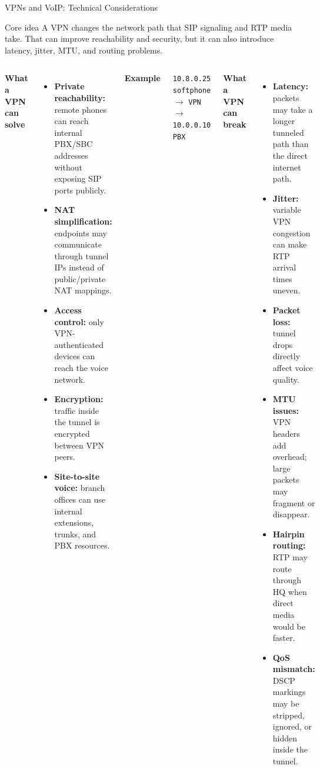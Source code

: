 \documentclass[aspectratio=169]{beamer}
\begin{document}
\begin{frame}{VPNs and VoIP: Technical Considerations}
\scriptsize

\begin{block}{Core idea}
A VPN changes the network path that SIP signaling and RTP media take. That can improve reachability and security, but it can also introduce latency, jitter, MTU, and routing problems.
\end{block}

\vspace{0.15cm}

\begin{columns}[T]

\textbf{What a VPN can solve}

\begin{itemize}
    \item \textbf{Private reachability:} remote phones can reach internal PBX/SBC addresses without exposing SIP ports publicly.
    \item \textbf{NAT simplification:} endpoints may communicate through tunnel IPs instead of public/private NAT mappings.
    \item \textbf{Access control:} only VPN-authenticated devices can reach the voice network.
    \item \textbf{Encryption:} traffic inside the tunnel is encrypted between VPN peers.
    \item \textbf{Site-to-site voice:} branch offices can use internal extensions, trunks, and PBX resources.
\end{itemize}

\textbf{Example}

\begin{center}
\texttt{10.8.0.25 softphone}
$\rightarrow$
\texttt{VPN}
$\rightarrow$
\texttt{10.0.0.10 PBX}
\end{center}


\textbf{What a VPN can break}

\begin{itemize}
    \item \textbf{Latency:} packets may take a longer tunneled path than the direct internet path.
    \item \textbf{Jitter:} variable VPN congestion can make RTP arrival times uneven.
    \item \textbf{Packet loss:} tunnel drops directly affect voice quality.
    \item \textbf{MTU issues:} VPN headers add overhead; large packets may fragment or disappear.
    \item \textbf{Hairpin routing:} RTP may route through HQ when direct media would be faster.
    \item \textbf{QoS mismatch:} DSCP markings may be stripped, ignored, or hidden inside the tunnel.
\end{itemize}


\end{columns}
\end{frame}
\end{document}
